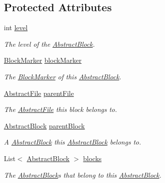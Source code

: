 \subsection*{Protected Attributes}
\begin{DoxyCompactItemize}
\item 
int \hyperlink{class_a_rdev_kit_1_1_model_1_1_project_1_1_file_1_1_abstract_block_a7c07abfe27f2f9104fe7c3d23c7333a5}{level}
\begin{DoxyCompactList}\small\item\em The level of the \hyperlink{class_a_rdev_kit_1_1_model_1_1_project_1_1_file_1_1_abstract_block}{Abstract\-Block}. \end{DoxyCompactList}\item 
\hyperlink{class_a_rdev_kit_1_1_model_1_1_project_1_1_file_1_1_block_marker}{Block\-Marker} \hyperlink{class_a_rdev_kit_1_1_model_1_1_project_1_1_file_1_1_abstract_block_a0975ceb65947c7370dcb6565677e9d0e}{block\-Marker}
\begin{DoxyCompactList}\small\item\em The \hyperlink{class_a_rdev_kit_1_1_model_1_1_project_1_1_file_1_1_block_marker}{Block\-Marker} of this \hyperlink{class_a_rdev_kit_1_1_model_1_1_project_1_1_file_1_1_abstract_block}{Abstract\-Block}. \end{DoxyCompactList}\item 
\hyperlink{class_a_rdev_kit_1_1_model_1_1_project_1_1_file_1_1_abstract_file}{Abstract\-File} \hyperlink{class_a_rdev_kit_1_1_model_1_1_project_1_1_file_1_1_abstract_block_a7dd07d5a865359c764a8cdab272a0662}{parent\-File}
\begin{DoxyCompactList}\small\item\em The \hyperlink{class_a_rdev_kit_1_1_model_1_1_project_1_1_file_1_1_abstract_file}{Abstract\-File} this block belongs to. \end{DoxyCompactList}\item 
\hyperlink{class_a_rdev_kit_1_1_model_1_1_project_1_1_file_1_1_abstract_block}{Abstract\-Block} \hyperlink{class_a_rdev_kit_1_1_model_1_1_project_1_1_file_1_1_abstract_block_aaa3372dadcd8d2b6ff2356ec984551c9}{parent\-Block}
\begin{DoxyCompactList}\small\item\em A \hyperlink{class_a_rdev_kit_1_1_model_1_1_project_1_1_file_1_1_abstract_block}{Abstract\-Block} this \hyperlink{class_a_rdev_kit_1_1_model_1_1_project_1_1_file_1_1_abstract_block}{Abstract\-Block} belongs to. \end{DoxyCompactList}\item 
List$<$ \hyperlink{class_a_rdev_kit_1_1_model_1_1_project_1_1_file_1_1_abstract_block}{Abstract\-Block} $>$ \hyperlink{class_a_rdev_kit_1_1_model_1_1_project_1_1_file_1_1_abstract_block_ae48e43536b76e45e5c84b837cc9bc093}{blocks}
\begin{DoxyCompactList}\small\item\em The \hyperlink{class_a_rdev_kit_1_1_model_1_1_project_1_1_file_1_1_abstract_block}{Abstract\-Block}s that belong to this \hyperlink{class_a_rdev_kit_1_1_model_1_1_project_1_1_file_1_1_abstract_block}{Abstract\-Block}. \end{DoxyCompactList}\end{DoxyCompactItemize}
